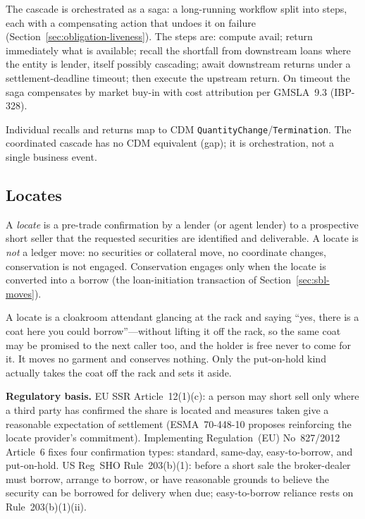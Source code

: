 The cascade is orchestrated as a saga: a long-running workflow split into steps, each with a compensating action that undoes it on failure (Section~\ref{sec:obligation-liveness}). The steps are: compute $\mathrm{avail}$; return immediately what is available; recall the shortfall from downstream loans where the entity is lender, itself possibly cascading; await downstream returns under a settlement-deadline timeout; then execute the upstream return. On timeout the saga compensates by market buy-in with cost attribution per GMSLA~9.3 (IBP-328).

Individual recalls and returns map to CDM \texttt{QuantityChange}/\texttt{Termination}. The coordinated cascade has no CDM equivalent (gap); it is orchestration, not a single business event.

\subsection{Locates}
\label{sec:sbl-locates}

A \emph{locate} is a pre-trade confirmation by a lender (or agent lender) to a prospective short seller that the requested securities are identified and deliverable. A locate is \emph{not} a ledger move: no securities or collateral move, no coordinate changes, conservation is not engaged. Conservation engages only when the locate is converted into a borrow (the loan-initiation transaction of Section~\ref{sec:sbl-moves}).

\begin{mentalmodel}
A locate is a cloakroom attendant glancing at the rack and saying ``yes, there is a coat here you could borrow''---without lifting it off the rack, so the same coat may be promised to the next caller too, and the holder is free never to come for it. It moves no garment and conserves nothing. Only the put-on-hold kind actually takes the coat off the rack and sets it aside.
\end{mentalmodel}

\noindent\textbf{Regulatory basis.} EU SSR Article~12(1)(c): a person may short sell only where a third party has confirmed the share is located and measures taken give a reasonable expectation of settlement (ESMA~70-448-10 proposes reinforcing the locate provider's commitment). Implementing Regulation~(EU) No~827/2012 Article~6 fixes four confirmation types: standard, same-day, easy-to-borrow, and put-on-hold. US Reg~SHO Rule~203(b)(1): before a short sale the broker-dealer must borrow, arrange to borrow, or have reasonable grounds to believe the security can be borrowed for delivery when due; easy-to-borrow reliance rests on Rule~203(b)(1)(ii).

